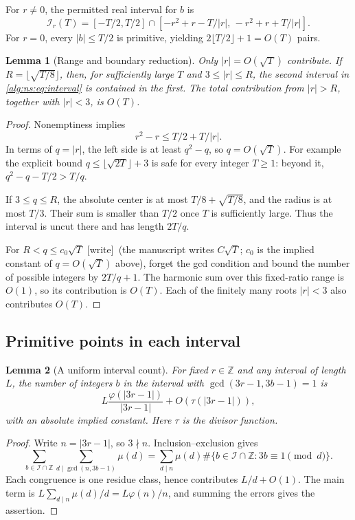 \documentclass[11pt]{article}
\numberwithin{equation}{section}
\theoremstyle{plain}
\theoremstyle{plain}
\newtheorem{lemma}[lemma]{Lemma}
\theoremstyle{plain}
\theoremstyle{definition}
\theoremstyle{definition}
\theoremstyle{definition}
\theoremstyle{remark}
\newcommand{\Z}{\mathbb Z}\newcommand{\Q}{\mathbb Q}
\newcommand{\wtag}{\textup{[write]}}%
\begin{document}
For $r\ne0$, the permitted real interval for $b$ is
\begin{equation}\label{alg:ns:eq:interval}
\mathcal I_r(T)=
[-T/2,T/2]\cap
[-r^2+r-T/|r|,\,-r^2+r+T/|r|].
\end{equation}
For $r=0$, every $|b|\le T/2$ is primitive, yielding
$2\lfloor T/2\rfloor+1=O(T)$ pairs.

\begin{lemma}[Range and boundary reduction]\label{alg:ns:lem:range}
Only $|r|=O(\sqrt T)$ contribute. If
$R=\lfloor\sqrt{T/8}\rfloor$, then, for sufficiently large $T$ and
$3\le|r|\le R$, the second interval in \eqref{alg:ns:eq:interval} is contained
in the first. The total contribution from $|r|>R$, together with
$|r|<3$, is $O(T)$.
\end{lemma}
\begin{proof}
Nonemptiness implies
\[
r^2-r\le T/2+T/|r|.
\]
In terms of $q=|r|$, the left side is at least $q^2-q$, so $q=O(\sqrt T)$.
For example the explicit bound $q\le\lfloor\sqrt{2T}\rfloor+3$ is safe
for every integer $T\ge1$: beyond it,
$q^2-q-T/2>T/q$.

If $3\le q\le R$, the absolute center is at most $T/8+\sqrt{T/8}$,
and the radius is at most $T/3$. Their sum is smaller than $T/2$ once
$T$ is sufficiently large. Thus the interval is uncut there and has
length $2T/q$.

For $R<q\le c_0\sqrt T$ \wtag{}~(the manuscript writes $C\sqrt T$; $c_0$ is the implied constant of $q=O(\sqrt T)$ above), forget the gcd condition and bound the number
of possible integers by $2T/q+1$. The harmonic sum over this fixed-ratio
range is $O(1)$, so its contribution is $O(T)$. Each of the finitely
many roots $|r|<3$ also contributes $O(T)$.
\end{proof}

\subsection{Primitive points in each interval}
\begin{lemma}[A uniform interval count]\label{alg:ns:lem:primitive}
For fixed $r\in\Z$ and any interval of length $L$, the number of
integers $b$ in the interval with $\gcd(3r-1,3b-1)=1$ is
\begin{equation}\label{alg:ns:eq:primitivecount}
L\frac{\varphi(|3r-1|)}{|3r-1|}+O(\tau(|3r-1|)),
\end{equation}
with an absolute implied constant. Here $\tau$ is the divisor function.
\end{lemma}
\begin{proof}
Write $n=|3r-1|$, so $3\nmid n$. Inclusion--exclusion gives
\[
\sum_{b\in\mathcal I\cap\Z}
\sum_{d\mid\gcd(n,3b-1)}\mu(d)
=\sum_{d\mid n}\mu(d)
\#\{b\in\mathcal I\cap\Z:3b\equiv1\pmod d\}.
\]
Each congruence is one residue class, hence contributes $L/d+O(1)$.
The main term is $L\sum_{d\mid n}\mu(d)/d=L\varphi(n)/n$, and summing
the errors gives the assertion.
\end{proof}
\end{document}
